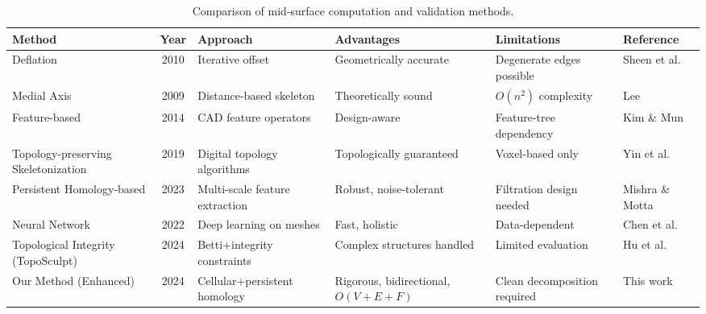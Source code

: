 \documentclass[conference]{IEEEtran}
\begin{document}
\begin{table}[h]
\centering
\caption{Comparison of mid-surface computation and validation methods.}
\begin{tabular}{|l|c|l|l|l|l|}
\hline
\textbf{Method} & \textbf{Year} & \textbf{Approach} & \textbf{Advantages} & \textbf{Limitations} & \textbf{Reference} \\
\hline
Deflation & 2010 & Iterative offset & Geometrically accurate & Degenerate edges possible & Sheen et al. \cite{Sheen2010} \\
Medial Axis & 2009 & Distance-based skeleton & Theoretically sound & $O(n^2)$ complexity & Lee \cite{Lee2009} \\
Feature-based & 2014 & CAD feature operators & Design-aware & Feature-tree dependency & Kim \& Mun \cite{Kim2014} \\
Topology-preserving Skeletonization & 2019 & Digital topology algorithms & Topologically guaranteed & Voxel-based only & Yin et al. \cite{Yin2019} \\
Persistent Homology-based & 2023 & Multi-scale feature extraction & Robust, noise-tolerant & Filtration design needed & Mishra \& Motta \cite{Mishra2023} \\
Neural Network & 2022 & Deep learning on meshes & Fast, holistic & Data-dependent & Chen et al. \cite{Chen2022} \\
Topological Integrity (TopoSculpt) & 2024 & Betti+integrity constraints & Complex structures handled & Limited evaluation & Hu et al. \cite{Hu2024} \\
Our Method (Enhanced) & 2024 & Cellular+persistent homology & Rigorous, bidirectional, $O(V+E+F)$ & Clean decomposition required & This work \\
\hline
\end{tabular}
\end{table}
\end{document}
